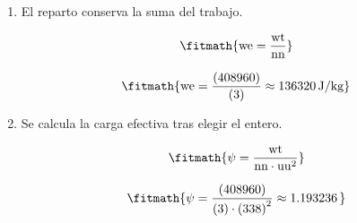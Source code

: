 \begin{enumerate}

\item El reparto conserva la suma del trabajo.

\[\fitmath{\mathrm{we}=\frac{\mathrm{wt}}{\mathrm{nn}}}\]

\[\fitmath{\mathrm{we}=\frac{(408960)}{(3)}\approx 136320\,\mathrm{J/kg}}\]

\item Se calcula la carga efectiva tras elegir el entero.

\[\fitmath{\psi=\frac{\mathrm{wt}}{\mathrm{nn}\cdot {\mathrm{uu}}^{2}}}\]

\[\fitmath{\psi=\frac{(408960)}{(3)\cdot {(338)}^{2}}\approx 1.193236\,}\]

\end{enumerate}
